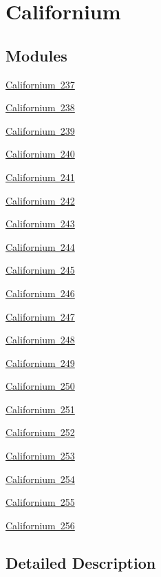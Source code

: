 \hypertarget{group___isotope_const-_californium}{}\section{Californium}
\label{group___isotope_const-_californium}
\subsection*{Modules}
\begin{DoxyCompactItemize}
\item 
\mbox{\hyperlink{group___isotope_const-_californium-_cf237}{Californium 237}}
\item 
\mbox{\hyperlink{group___isotope_const-_californium-_cf238}{Californium 238}}
\item 
\mbox{\hyperlink{group___isotope_const-_californium-_cf239}{Californium 239}}
\item 
\mbox{\hyperlink{group___isotope_const-_californium-_cf240}{Californium 240}}
\item 
\mbox{\hyperlink{group___isotope_const-_californium-_cf241}{Californium 241}}
\item 
\mbox{\hyperlink{group___isotope_const-_californium-_cf242}{Californium 242}}
\item 
\mbox{\hyperlink{group___isotope_const-_californium-_cf243}{Californium 243}}
\item 
\mbox{\hyperlink{group___isotope_const-_californium-_cf244}{Californium 244}}
\item 
\mbox{\hyperlink{group___isotope_const-_californium-_cf245}{Californium 245}}
\item 
\mbox{\hyperlink{group___isotope_const-_californium-_cf246}{Californium 246}}
\item 
\mbox{\hyperlink{group___isotope_const-_californium-_cf247}{Californium 247}}
\item 
\mbox{\hyperlink{group___isotope_const-_californium-_cf248}{Californium 248}}
\item 
\mbox{\hyperlink{group___isotope_const-_californium-_cf249}{Californium 249}}
\item 
\mbox{\hyperlink{group___isotope_const-_californium-_cf250}{Californium 250}}
\item 
\mbox{\hyperlink{group___isotope_const-_californium-_cf251}{Californium 251}}
\item 
\mbox{\hyperlink{group___isotope_const-_californium-_cf252}{Californium 252}}
\item 
\mbox{\hyperlink{group___isotope_const-_californium-_cf253}{Californium 253}}
\item 
\mbox{\hyperlink{group___isotope_const-_californium-_cf254}{Californium 254}}
\item 
\mbox{\hyperlink{group___isotope_const-_californium-_cf255}{Californium 255}}
\item 
\mbox{\hyperlink{group___isotope_const-_californium-_cf256}{Californium 256}}
\end{DoxyCompactItemize}


\subsection{Detailed Description}
